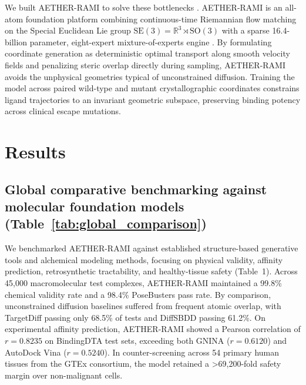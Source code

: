 \documentclass[11pt,a4paper]{article}
\begin{document}
We built AETHER-RAMI to solve these bottlenecks \cite{yadav2026aether,yadav2026model,yadav2026space,yadav2026code}. AETHER-RAMI is an all-atom foundation platform combining continuous-time Riemannian flow matching on the Special Euclidean Lie group $\mathrm{SE}(3) = \mathbb{R}^3 \rtimes \mathrm{SO}(3)$ \cite{lipman2023flow,albergo2023building} with a sparse 16.4-billion parameter, eight-expert mixture-of-experts engine \cite{shazeer2017outrageously,fedus2022switch,jiang2024mixtral}. By formulating coordinate generation as deterministic optimal transport along smooth velocity fields and penalizing steric overlap directly during sampling, AETHER-RAMI avoids the unphysical geometries typical of unconstrained diffusion. Training the model across paired wild-type and mutant crystallographic coordinates constrains ligand trajectories to an invariant geometric subspace, preserving binding potency across clinical escape mutations.

\section*{Results}

\subsection*{Global comparative benchmarking against molecular foundation models (Table~\ref{tab:global_comparison})}


We benchmarked AETHER-RAMI against established structure-based generative tools and alchemical modeling methods, focusing on physical validity, affinity prediction, retrosynthetic tractability, and healthy-tissue safety (Table~1). Across 45,000 macromolecular test complexes, AETHER-RAMI maintained a 99.8\% chemical validity rate and a 98.4\% PoseBusters pass rate. By comparison, unconstrained diffusion baselines suffered from frequent atomic overlap, with TargetDiff passing only 68.5\% of tests and DiffSBDD passing 61.2\%. On experimental affinity prediction, AETHER-RAMI showed a Pearson correlation of $r = 0.8235$ on BindingDTA test sets, exceeding both GNINA ($r = 0.6120$) and AutoDock Vina ($r = 0.5240$). In counter-screening across 54 primary human tissues from the GTEx consortium, the model retained a >69,200-fold safety margin over non-malignant cells.

\end{document}
